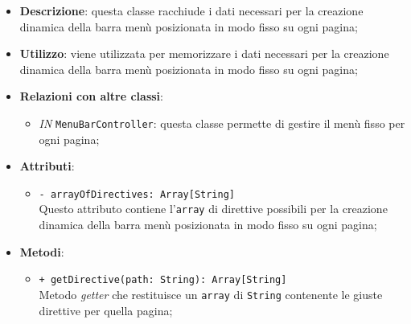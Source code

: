 		\begin{itemize}
			\item \textbf{Descrizione}: questa classe racchiude i dati necessari per la creazione dinamica della barra menù posizionata in modo fisso su ogni pagina;
			\item \textbf{Utilizzo}: viene utilizzata per memorizzare i dati necessari per la creazione dinamica della barra menù posizionata in modo fisso su ogni pagina;
			\item \textbf{Relazioni con altre classi}: 
			\begin{itemize}
				\item \textit{IN} \texttt{MenuBarController}: questa classe permette di gestire il menù fisso per ogni pagina;
			\end{itemize}
			\item \textbf{Attributi}: 
			\begin{itemize}
				\item \texttt{- arrayOfDirectives: Array[String]}\\
				Questo attributo contiene l'\texttt{array} di direttive possibili per la creazione dinamica della barra menù posizionata in modo fisso su ogni pagina;
			\end{itemize}
			\item \textbf{Metodi}: 
			\begin{itemize}
				\item \texttt{+ getDirective(path: String): Array[String]} \\
				Metodo \textit{getter} che restituisce un \texttt{array} di \texttt{String} contenente le giuste direttive per quella pagina;
				
			\end{itemize}
		\end{itemize}		
		
		
		